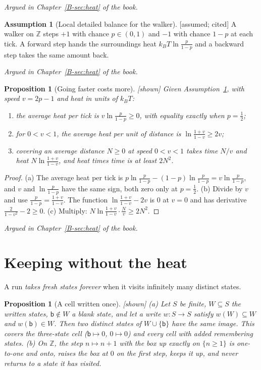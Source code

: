 \documentclass[11pt, a4paper]{article}
\theoremstyle{plain}
\newtheorem{proposition}[theorem]{Proposition}
\theoremstyle{definition}
\newtheorem{assumption}[theorem]{Assumption}
\theoremstyle{remark}
\newcommand{\Z}{\mathbb{Z}}
\newcommand{\argued}[1]{\par\noindent\textit{Argued in Chapter~\ref{B-#1} of the book.}\par}
\newcommand{\kind}[1]{\textup{[#1]}}
\begin{document}
\argued{sec:heat}

\begin{assumption}[Local detailed balance for the walker]\label{spec:ldb} \kind{assumed; cited}
A walker on $\Z$ steps $+1$ with chance $p\in(0,1)$ and $-1$ with chance $1-p$ at each tick. A forward step
hands the surroundings heat $k_BT\ln\frac{p}{1-p}$ and a backward step takes the same amount back.
\end{assumption}

\argued{sec:heat}

\begin{proposition}[Going faster costs more]\label{spec:walker} \kind{shown}
Given Assumption~\ref{spec:ldb}, with speed $v=2p-1$ and heat in units of $k_BT$:
\begin{enumerate}[label=(\alph*)]
\item the average heat per tick is $v\ln\frac{p}{1-p}\ge0$, with equality exactly when $p=\frac12$;
\item for $0<v<1$, the average heat per unit of distance is $\ln\frac{1+v}{1-v}\ge2v$;
\item covering an average distance $N\ge0$ at speed $0<v<1$ takes time $N/v$ and heat
$N\ln\frac{1+v}{1-v}$, and heat times time is at least $2N^2$.
\end{enumerate}
\end{proposition}

\begin{proof}
(a) The average heat per tick is $p\ln\frac p{1-p}-(1-p)\ln\frac p{1-p}=v\ln\frac p{1-p}$, and $v$ and
$\ln\frac p{1-p}$ have the same sign, both zero only at $p=\frac12$. (b) Divide by $v$ and use
$\frac p{1-p}=\frac{1+v}{1-v}$. The function $\ln\frac{1+v}{1-v}-2v$ is $0$ at $v=0$ and has derivative
$\frac2{1-v^2}-2\ge0$. (c) Multiply: $N\ln\frac{1+v}{1-v}\cdot\frac Nv\ge2N^2$.
\end{proof}

\argued{sec:heat}

\section{Keeping without the heat}\label{spec:ch21}

A run \emph{takes fresh states forever} when it visits infinitely many distinct states.

\begin{proposition}[A cell written once]\label{spec:write-once} \kind{shown}
(a) Let $S$ be finite, $W\subseteq S$ the written states, $\mathsf b\notin W$ a blank state, and let a write
$w:S\to S$ satisfy $w(W)\subseteq W$ and $w(\mathsf b)\in W$. Then two distinct states of $W\cup\{\mathsf b\}$
have the same image. This covers the three-state cell ($\mathsf b\mapsto0$, $0\mapsto0$) and every cell with
added remembering states.
(b) On $\Z$, the step $n\mapsto n+1$ with the box up exactly on $\{n\ge1\}$ is one-to-one and onto, raises
the box at $0$ on the first step, keeps it up, and never returns to a state it has visited.
\end{proposition}
\end{document}
